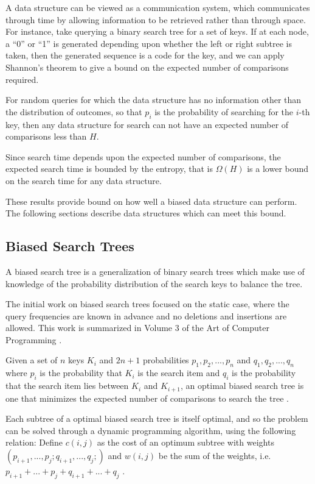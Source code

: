 \documentclass[mcs]{scsthesis}
\begin{document}
A data structure can be viewed as a communication system, which communicates
through time by allowing information to be retrieved rather than through space.
For instance, take querying a binary search tree for a set of keys. If at each
node, a ``0'' or ``1'' is generated depending upon whether the left or right
subtree is taken, then the generated sequence is a code for the key, and we can
apply Shannon's theorem to give a bound on the expected number of comparisons
required.

For random queries for which the data structure has no information other than
the distribution of outcomes, so that \(p_i\) is the probability of searching for
the \(i\)-th key, then any data structure for search can not have an expected
number of comparisons less than \(H\).

Since search time depends upon the expected number of comparisons, the expected
search time is bounded by the entropy, that is \(\Omega(H)\) is a lower bound on
the search time for any data structure.

These results provide bound on how well a biased data structure can perform. The
following sections describe data structures which can meet this bound.

\subsection{Biased Search Trees}

A biased search tree is a generalization of binary search trees which make use
of knowledge of the probability distribution of the search keys to balance the
tree.

The initial work on biased search trees focused on the static case, where
the query frequencies are known in advance and no deletions and insertions
are allowed. This work is summarized in Volume 3 of the Art of Computer
Programming \cite{knuth}.

Given a set of $n$ keys \(K_i\) and \(2n + 1\) probabilities
\(p_1, p_2, ..., p_n\) and \(q_1, q_2, ..., q_n\) where \(p_i\) is the
probability that \(K_i\) is the search item and \(q_i\) is the
probability that the search item lies between \(K_i\) and \(K_{i+1}\), an
optimal biased search tree is one that minimizes the expected number of
comparisons to search the tree \cite{knuth}.

Each subtree of a optimal biased search tree is itself optimal, and so the
problem can be solved through a dynamic programming algorithm, using the
following relation: Define \( c(i,j)\) as the cost of an optimum subtree with
weights \((p_{i+1}, ..., p_j; q_{i+1}, ..., q_j;)\) and \(w(i, j)\) be the
sum of the weights, i.e. \(p_{i+1} + ... + p_j + q_{i + 1} + ... + q_j \)
\cite{knuth}.
\end{document}
